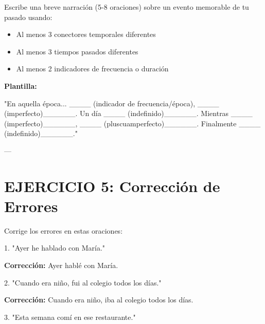 \documentclass[a4paper,11pt]{article}
\begin{document}
\vspace{0.2cm}

Escribe una breve narración (5-8 oraciones) sobre un evento memorable de tu pasado usando:

\begin{itemize}

  \item Al menos 3 conectores temporales diferentes

  \item Al menos 3 tiempos pasados diferentes

  \item Al menos 2 indicadores de frecuencia o duración

\end{itemize}

\vspace{0.2cm}

\textbf{Plantilla:}

"En aquella época... ____ (indicador de frecuencia/época), ____ (imperfecto)______. Un día ____ (indefinido)______. Mientras ____ (imperfecto)______, ____ (pluscuamperfecto)______. Finalmente ____ (indefinido)______."

\vspace{0.2cm}

---

\vspace{0.2cm}

\section{EJERCICIO 5: Corrección de Errores}

\vspace{0.2cm}

Corrige los errores en estas oraciones:

\vspace{0.2cm}

1. "Ayer he hablado con María."

\textbf{Corrección:} Ayer hablé con María.

\vspace{0.2cm}

2. "Cuando era niño, fui al colegio todos los días."

\textbf{Corrección:} Cuando era niño, iba al colegio todos los días.

\vspace{0.2cm}

3. "Esta semana comí en ese restaurante."
\end{document}

